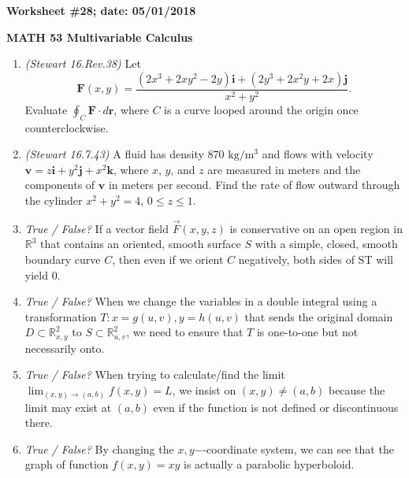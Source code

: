 \documentclass{article}
\newcommand{\ii}{\mathbf{i}}
\newcommand{\jj}{\mathbf{j}}
\newcommand{\kk}{\mathbf{k}}
\newcommand{\rr}{\mathbf{r}}
\newcommand{\vv}{\mathbf{v}}
\newcommand{\FF}{\mathbf{F}}
\begin{document}
{\bf Worksheet \#28; date: 05/01/2018}

{\bf MATH 53 Multivariable Calculus}

\begin{enumerate}

\item {\em (Stewart 16.Rev.38)} Let
\[
\FF(x, y) = \frac{(2x^3 + 2xy^2 - 2y) \ii + (2y^3 + 2x^2 y + 2x) \jj}{x^2 + y^2}.
\]
Evaluate $\oint_C \FF \cdot d\rr$, where $C$ is a curve looped around the origin once counterclockwise.

\item {\em (Stewart 16.7.43)} A fluid has density $870 \text{ kg}/\text{m}^3$ and flows with velocity $\vv = z \ii + y^2 \jj + x^2 \kk$, where $x$, $y$, and $z$ are measured in meters and the components of $\vv$ in meters per second. Find the rate of flow outward through the cylinder $x^2 + y^2 = 4$, $0 \le z \le 1$.

\item {\em True / False?} If a vector field $\vec{F}(x,y,z)$ is conservative on an open region in $\mathbb{R}^3$ that contains an oriented, smooth surface $S$ with a simple, closed, smooth boundary curve $C$, then even if we orient $C$ negatively, both sides of ST will yield $0$.

\item {\em True / False?} When we change the variables in a double integral using a transformation $T: x=g(u,v), y=h(u,v)$ that sends the original domain $D\subset \mathbb{R}^2_{x,y}$ to $S\subset \mathbb{R}^2_{u,v}$, we need to ensure that $T$ is one-to-one but not necessarily onto.

\item {\em True / False?} When trying to calculate/find the limit $\displaystyle{\lim_{(x,y)\rightarrow(a,b)}f(x,y)=L}$, we insist on $(x,y){\not =} (a,b)$ because the limit may exist at $(a,b)$ even if the function is not defined or discontinuous there.

\item {\em True / False?} By changing the $x,y$−-coordinate system, we can see that the graph of function $f(x,y)=xy$ is actually a parabolic hyperboloid.
\end{enumerate}
\end{document}
